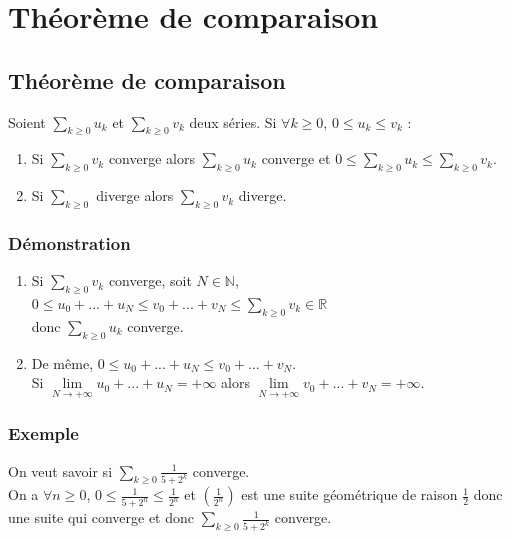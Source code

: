 \documentclass[a4paper,10pt]{book} %
\newcommand{\R}{\mathbb{R}}
\newcommand{\N}{\mathbb{N}}
\newcommand{\displayAmath}{\displaystyle}
\begin{document}
\newpage

\section{Théorème de comparaison}
\subsection{Théorème de comparaison}
Soient $\displayAmath\sum_{k\geq 0}u_k$ et $\displayAmath\sum_{k\geq 0}v_k$ deux séries. Si $\forall k\geq 0$, $0\leq u_k\leq v_k$ :\smallskip
\begin{enumerate}
\item Si $\displayAmath\sum_{k\geq 0}v_k$ converge
alors $\displayAmath\sum_{k\geq 0}u_k$ converge
et $\displayAmath0\leq \sum_{k\geq 0}u_k\leq \sum_{k\geq 0}v_k$.

\item Si $\displayAmath\sum_{k\geq 0}$ diverge alors $\displayAmath\sum_{k\geq 0} v_k$ diverge.
\end{enumerate}

\subsubsection{Démonstration}
\begin{enumerate}
\item Si $\displayAmath\sum_{k\geq 0} v_k$ converge, soit $N\in\N$, $\displayAmath0\leq u_0+...+u_N\leq v_0+...+v_N\leq \sum_{k\geq 0}v_k\in\R$\\donc $\displayAmath\sum_{k\geq 0}u_k$ converge.

\item De même, $0\leq u_0+...+u_N\leq v_0+...+v_N$.\\
Si $\displayAmath\lim\limits_{N\rightarrow+\infty}u_0+...+u_N=+\infty$ alors $\displayAmath\lim\limits_{N\rightarrow +\infty}v_0+...+v_N=+\infty$.
\end{enumerate}

\subsubsection{Exemple}
On veut savoir si $\displayAmath\sum_{k\geq 0}\frac{1}{5+2^k}$ converge.\\

On a $\forall n\geq 0$, $\displayAmath 0\leq \frac{1}{5+2^n}\leq \frac{1}{2^n}$ et $\displayAmath (\frac{1}{2^n})$ est une suite géométrique de raison $\frac{1}{2}$ donc une suite qui converge et donc $\displayAmath\sum_{k\geq 0}\frac{1}{5+2^k}$ converge.
\end{document}
